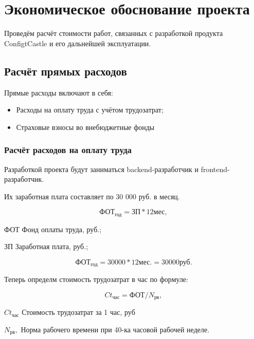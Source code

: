 \section{Экономическое обоснование проекта}

Проведём расчёт стоимости работ, связанных с разработкой
продукта ConfigtCastle и его дальнейшей эксплуатации.

\tocless\subsection{Расчёт прямых расходов}

Прямые расходы включают в себя:
\begin{itemize}
    \item Расходы на оплату труда с учётом трудозатрат;
    \item Страховые взносы во внебюджетные фонды
\end{itemize}

\subsubsection{Расчёт расходов на оплату труда}

Разработкой проекта будут заниматься backend-разработчик и
frontend-разработчик.

Их заработная плата составляет по 30 000 руб. в месяц.

\begin{equation}
   \text{ФОТ}_\text{год} = \text{ЗП} * 12 \text{мес},
\end{equation}

\begin{eqexpl}[25mm]
    \item{ФОТ} Фонд оплаты труда, руб.;
    \item{ЗП} Заработная плата, руб.;
\end{eqexpl}

\begin{equation*}
    \text{ФОТ}_\text{год} = 30 000 * 12 \text{мес.} = 30 000 \text{руб.}
\end{equation*}

Теперь определм стоимость трудозатрат в час по формуле:

\begin{equation}
    Ct_\text{час} = \text{ФОТ} / N_\text{рв},
\end{equation}

\begin{eqexpl}[25mm]
    \item{$Ct_\text{час}$} Стоимость трудозатрат за 1 час, руб
    \item{$N_\text{рв},$} Норма рабочего времени при 40-ка часовой рабочей
неделе.
\end{eqexpl}

